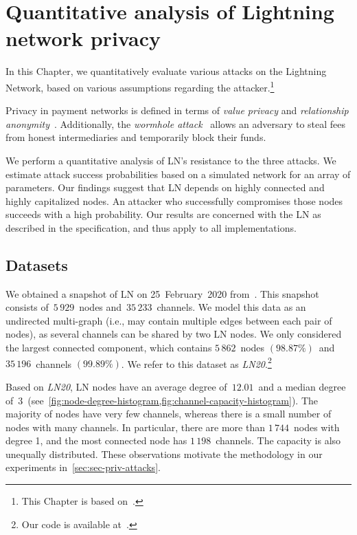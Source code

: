 \chapter{Quantitative analysis of Lightning network privacy}

\label{Chapter07LNattacks}

In this Chapter, we quantitatively evaluate various attacks on the Lightning Network, based on various assumptions regarding the attacker.\footnote{This Chapter is based on~\cite{Tikhomirov2020a}.}

Privacy in payment networks is defined in terms of \textit{value privacy} and \textit{relationship anonymity}~\cite{Malavolta2017}.
Additionally, the \textit{wormhole attack}~\cite{Malavolta2019} allows an adversary to steal fees from honest intermediaries and temporarily block their funds.

We perform a quantitative analysis of LN's resistance to the three attacks.
We estimate attack success probabilities based on a simulated network for an array of parameters.
Our findings suggest that LN depends on highly connected and highly capitalized nodes.
An attacker who successfully compromises those nodes succeeds with a high probability.
Our results are concerned with the LN as described in the specification, and thus apply to all implementations.


\section{Datasets}
\label{sec:datasets}

We obtained a snapshot of LN on 25~February~2020 from~\cite{fiatjaf2020}.
This snapshot consists of~$5\,929$~nodes and~$35\,233$~channels.
We model this data as an undirected multi-graph (i.e., may contain multiple edges between each pair of nodes), as several channels can be shared by two LN nodes.
We only considered the largest connected component, which contains $5\,862$~nodes $(98.87\%)$~and~$35\,196$~channels $(99.89\%)$.
We refer to this dataset as \emph{LN20}.\footnote{Our code is available at~\cite{Tikhomirov2019}.}

Based on \emph{LN20}, 
LN nodes have an average degree of~$12.01$~and a median degree of~$3$~(see~\cref{fig:node-degree-histogram,fig:channel-capacity-histogram}).
The majority of nodes have very few channels, 
whereas there is a small number of nodes with many channels.
In particular, there are more than $1\,744$~nodes with degree 1, and the most connected node has $1\,198$~channels.
The capacity is also unequally distributed.
These observations motivate the methodology in our experiments in~\cref{sec:sec-priv-attacks}.

